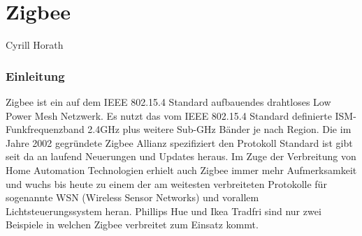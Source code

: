 \vspace*{4cm}
\part{Zigbee}\label{part:Zigbee}
Cyrill Horath
\vspace*{\fill}
\clearpage

\section{Einleitung}\label{sec:EinleitungZigbee}

Zigbee ist ein auf dem IEEE 802.15.4 Standard aufbauendes drahtloses Low Power Mesh Netzwerk. Es nutzt das vom IEEE 802.15.4 Standard definierte ISM-Funkfrequenzband 2.4GHz plus weitere Sub-GHz Bänder je nach Region.
Die im Jahre 2002 gegründete Zigbee Allianz spezifiziert den Protokoll Standard ist gibt seit da an laufend Neuerungen und Updates heraus.
Im Zuge der Verbreitung von Home Automation Technologien erhielt auch Zigbee immer mehr Aufmerksamkeit und wuchs bis heute zu einem der am weitesten verbreiteten Protokolle für sogenannte WSN (Wireless Sensor Networks) und vorallem Lichtsteuerungssystem heran. Phillips Hue und Ikea Tradfri sind nur zwei Beispiele in welchen Zigbee verbreitet zum Einsatz kommt.





